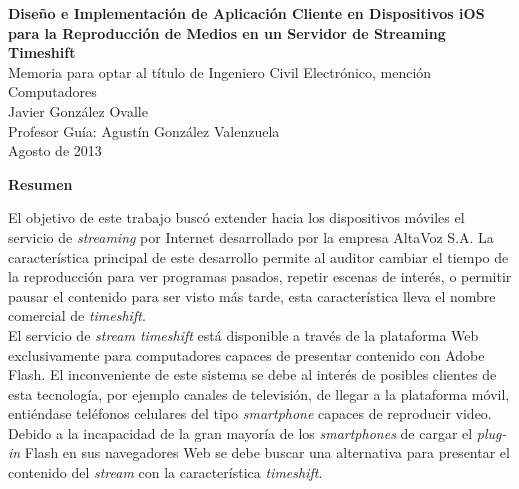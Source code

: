 \newpage
\begin{center}
 \Large \textbf{Diseño e Implementación de Aplicación Cliente en Dispositivos iOS para la Reproducción de Medios en un Servidor de Streaming Timeshift}\\

\normalsize Memoria para optar al título de Ingeniero Civil Electrónico, mención Computadores \\
\normalsize Javier González Ovalle \\
\normalsize Profesor Guía: Agustín González Valenzuela \\
\normalsize Agosto de 2013 %

\Large \textbf{Resumen}

\end{center}
\normalsize


El objetivo de este trabajo buscó extender hacia los dispositivos móviles el servicio de \textit{streaming} por Internet desarrollado por la empresa AltaVoz S.A. La característica principal de este desarrollo permite al auditor cambiar el tiempo de la reproducción para ver programas pasados, repetir escenas de interés, o permitir pausar el contenido para ser visto más tarde, esta característica lleva el nombre comercial de \textit{timeshift}.\\


El servicio de \textit{stream timeshift} está disponible a través de la plataforma Web exclusivamente para computadores capaces de presentar contenido con Adobe Flash. El inconveniente de este sistema se debe al interés de posibles clientes de esta tecnología, por ejemplo canales de televisión, de llegar a la plataforma móvil, entiéndase teléfonos celulares del tipo \textit{smartphone} capaces de reproducir video. Debido a la incapacidad de la gran mayoría de los \textit{smartphones} de cargar el \textit{plug-in} Flash en sus navegadores Web se debe buscar una alternativa para presentar el contenido del \textit{stream} con la característica \textit{timeshift}.
\\

